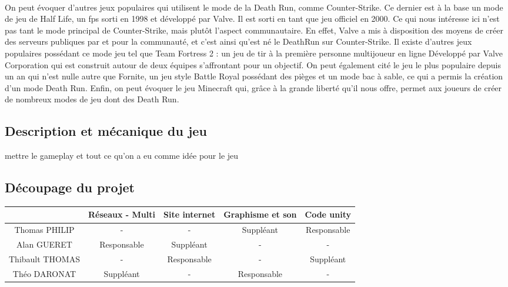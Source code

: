 \documentclass[12pt]{report}
\begin{document}
	\paragraph{}
	On peut évoquer d'autres jeux populaires qui utilisent le mode de la Death Run, comme Counter-Strike. Ce dernier est à la base un mode de jeu de Half Life, un fps sorti en 1998 et développé par Valve. Il est sorti en tant que jeu officiel en 2000. Ce qui nous intéresse ici n'est pas tant le mode principal de Counter-Strike, mais plutôt l'aspect communautaire. En effet, Valve a mis à disposition des moyens de créer des serveurs publiques par et pour la communauté, et c'est ainsi qu'est né le DeathRun sur Counter-Strike.
	Il existe d'autres jeux populaires possédant ce mode jeu tel que Team Fortress 2 : un jeu de tir à la première personne multijoueur en ligne Développé par Valve Corporation qui est construit autour de deux équipes s'affrontant pour un objectif. On peut également cité le jeu le plus populaire depuis un an qui n'est nulle autre que Fornite, un jeu style Battle Royal possédant des pièges et un mode bac à sable, ce qui a permis la création d'un mode Death Run. Enfin, on peut évoquer le jeu Minecraft qui, grâce à la grande liberté qu'il nous offre, permet aux joueurs de créer de nombreux modes de jeu dont des Death Run.
	
	\subsection{Description et mécanique du jeu}
	
		mettre le gameplay et tout ce qu'on a eu comme idée pour le jeu
	
	\subsection{Découpage du projet} %
		
	
	
	\begin{tabular}{|*{5}{c|}}
	\hline
		& Réseaux - Multi & Site internet & Graphisme et son & Code unity \\
		\hline
		Thomas PHILIP & - & - & Suppléant & Responsable \\
		\hline
		Alan GUERET & Responsable & Suppléant & - & - \\
		\hline
		Thibault THOMAS & - & Responsable & - & Suppléant \\
		\hline
		Théo DARONAT & Suppléant & - & Responsable & - \\
		\hline
	
	\end{tabular}
	\\
	\\
	
\end{document}
